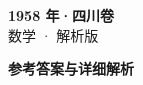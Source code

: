 \documentclass[zihao=-4, a4paper]{ctexart}
\begin{document}
\begin{center}
  {\Large\bfseries 1958 年·四川卷}\\[4pt]
  {\large 数学 · 解析版}
\end{center}
\medskip
{}

\clearpage
{}
\begin{center}{\Large\bfseries 参考答案与详细解析}\end{center}
\medskip

\end{document}
